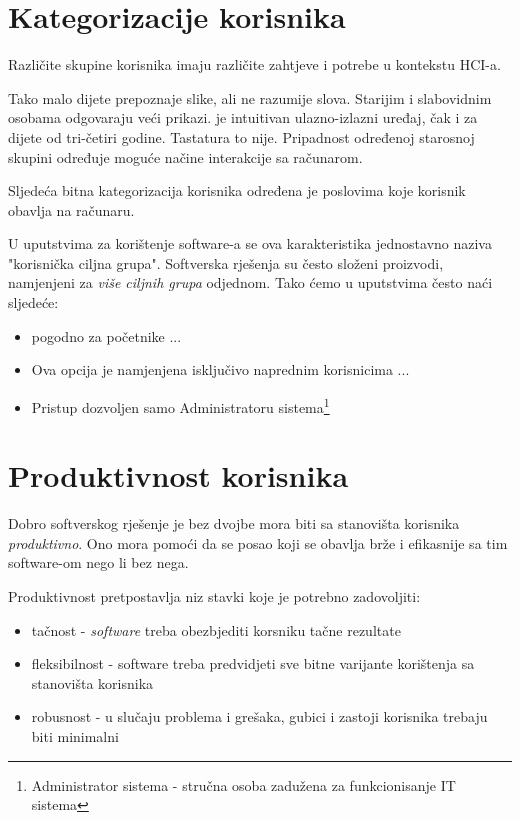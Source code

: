 \documentclass[times, utf8, seminar]{fit}
\begin{document}
\section{Kategorizacije korisnika}

Različite skupine korisnika imaju različite zahtjeve i potrebe u kontekstu HCI-a. 

Tako malo dijete prepoznaje slike, ali ne razumije slova. Starijim i slabovidnim osobama odgovaraju veći prikazi.  je intuitivan ulazno-izlazni uređaj, čak i za dijete od tri-četiri godine. Tastatura to nije. Pripadnost određenoj starosnoj skupini određuje moguće načine interakcije sa računarom.

Sljedeća bitna kategorizacija korisnika određena je poslovima koje korisnik obavlja na računaru. 

U uputstvima za korištenje software-a se ova karakteristika jednostavno naziva "korisnička ciljna grupa". Softverska rješenja su često složeni proizvodi, namjenjeni za \emph{više ciljnih grupa} odjednom. Tako ćemo u uputstvima često naći sljedeće:
\begin{itemize}
  \item pogodno za početnike ...
  \item Ova opcija je namjenjena isključivo naprednim korisnicima ...
  \item Pristup dozvoljen samo Administratoru sistema\footnote{Administrator sistema - stručna osoba zadužena za funkcionisanje IT sistema}
\end{itemize}

\section{Produktivnost korisnika}

Dobro softverskog rješenje je bez dvojbe mora biti sa stanovišta korisnika \emph{produktivno}. Ono mora pomoći da se posao koji se obavlja brže i efikasnije sa tim software-om nego li bez nega.

Produktivnost pretpostavlja niz stavki koje je potrebno zadovoljiti:
\begin{itemize}
  \item tačnost - \emph{software} treba obezbjediti korsniku tačne rezultate
  \item fleksibilnost - software treba predvidjeti sve bitne varijante korištenja sa stanovišta korisnika
  \item robusnost - u slučaju problema i grešaka, gubici i zastoji korisnika trebaju biti minimalni
\end{itemize}
\end{document}
